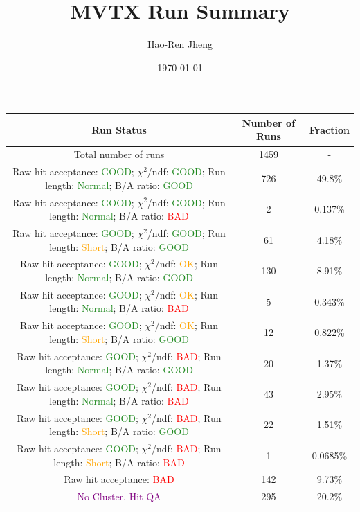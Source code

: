 \documentclass{article}
\title{MVTX Run Summary}
\author{Hao-Ren Jheng}
\date{\today}
\begin{document}
\maketitle
\begin{table}[h!]
\centering
\begin{tabular}{|c|c|c|}
\hline
Run Status & Number of Runs & Fraction \\
\hline
Total number of runs & 1459 & - \\
\hline
Raw hit acceptance: \textcolor{ForestGreen}{GOOD}; $\chi^{2}$/ndf: \textcolor{ForestGreen}{GOOD}; Run length: \textcolor{ForestGreen}{Normal}; B/A ratio: \textcolor{ForestGreen}{GOOD} & 726 & 49.8\% \\
Raw hit acceptance: \textcolor{ForestGreen}{GOOD}; $\chi^{2}$/ndf: \textcolor{ForestGreen}{GOOD}; Run length: \textcolor{ForestGreen}{Normal}; B/A ratio: \textcolor{Red}{BAD} & 2 & 0.137\% \\
Raw hit acceptance: \textcolor{ForestGreen}{GOOD}; $\chi^{2}$/ndf: \textcolor{ForestGreen}{GOOD}; Run length: \textcolor{Orange}{Short}; B/A ratio: \textcolor{ForestGreen}{GOOD} & 61 & 4.18\% \\
Raw hit acceptance: \textcolor{ForestGreen}{GOOD}; $\chi^{2}$/ndf: \textcolor{Orange}{OK}; Run length: \textcolor{ForestGreen}{Normal}; B/A ratio: \textcolor{ForestGreen}{GOOD} & 130 & 8.91\% \\
Raw hit acceptance: \textcolor{ForestGreen}{GOOD}; $\chi^{2}$/ndf: \textcolor{Orange}{OK}; Run length: \textcolor{ForestGreen}{Normal}; B/A ratio: \textcolor{Red}{BAD} & 5 & 0.343\% \\
Raw hit acceptance: \textcolor{ForestGreen}{GOOD}; $\chi^{2}$/ndf: \textcolor{Orange}{OK}; Run length: \textcolor{Orange}{Short}; B/A ratio: \textcolor{ForestGreen}{GOOD} & 12 & 0.822\% \\
Raw hit acceptance: \textcolor{ForestGreen}{GOOD}; $\chi^{2}$/ndf: \textcolor{Red}{BAD}; Run length: \textcolor{ForestGreen}{Normal}; B/A ratio: \textcolor{ForestGreen}{GOOD} & 20 & 1.37\% \\
Raw hit acceptance: \textcolor{ForestGreen}{GOOD}; $\chi^{2}$/ndf: \textcolor{Red}{BAD}; Run length: \textcolor{ForestGreen}{Normal}; B/A ratio: \textcolor{Red}{BAD} & 43 & 2.95\% \\
Raw hit acceptance: \textcolor{ForestGreen}{GOOD}; $\chi^{2}$/ndf: \textcolor{Red}{BAD}; Run length: \textcolor{Orange}{Short}; B/A ratio: \textcolor{ForestGreen}{GOOD} & 22 & 1.51\% \\
Raw hit acceptance: \textcolor{ForestGreen}{GOOD}; $\chi^{2}$/ndf: \textcolor{Red}{BAD}; Run length: \textcolor{Orange}{Short}; B/A ratio: \textcolor{Red}{BAD} & 1 & 0.0685\% \\
Raw hit acceptance: \textcolor{Red}{BAD} & 142 & 9.73\% \\
\textcolor{Purple}{No Cluster, Hit QA} & 295 & 20.2\% \\
\hline
\end{tabular}
\end{table}
\end{document}
